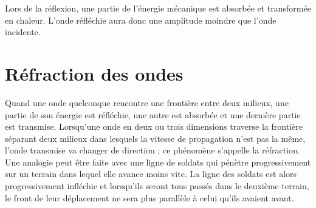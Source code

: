 
Lors de la réflexion, une partie de l'énergie mécanique est absorbée et transformée en chaleur. L'onde réfléchie aura donc une amplitude moindre que l'onde incidente.

\newpage

\section{Réfraction des ondes}
Quand une onde quelconque rencontre une frontière entre deux milieux, une partie de son énergie est réfléchie, une autre est absorbée et une dernière partie est transmise.
Lorsqu'une onde en deux ou trois dimensions traverse la frontière séparant deux milieux dans lesquels la vitesse de propagation n'est pas la même, l'onde transmise va changer de direction ; ce phénomène s'appelle la réfraction.
Une analogie peut être faite avec une ligne de soldats qui pénètre progressivement sur un terrain dans lequel elle avance moins vite. La ligne des soldats est alors progressivement infléchie et lorsqu'ils seront tous passés dans le deuxième terrain, le front de leur déplacement ne sera plus parallèle à celui qu'ils avaient avant.

